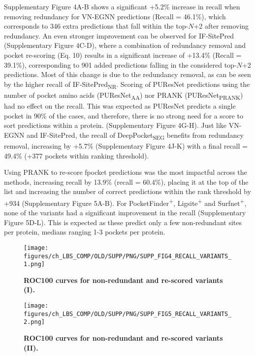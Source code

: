 Supplementary Figure 4A-B shows a significant +5.2\% increase in recall when removing redundancy for VN-EGNN predictions (Recall = 46.1\%), which corresponds to 346 extra predictions that fall within the top-$N$+2 after removing redundancy. An even stronger improvement can be observed for IF-SitePred (Supplementary Figure 4C-D), where a combination of redundancy removal and pocket re-scoring (Eq. 10) results in a significant increase of +13.4\% (Recall = 39.1\%), corresponding to 901 added predictions falling in the considered top-$N$+2 predictions. Most of this change is due to the redundancy removal, as can be seen by the higher recall of IF-SitePred\textsubscript{NR}. Scoring of PUResNet predictions using the number of pocket amino acids (PUResNet\textsubscript{AA}) nor PRANK (PUResNet\textsubscript{PRANK}) had no effect on the recall. This was expected as PUResNet predicts a single pocket in 90\% of the cases, and therefore, there is no strong need for a score to sort predictions within a protein. (Supplementary Figure 4G-H). Just like VN-EGNN and IF-SitePred, the recall of DeepPocket\textsubscript{SEG} benefits from redundancy removal, increasing by +5.7\% (Supplementary Figure 4J-K) with a final recall = 49.4\% (+377 pockets within ranking threshold).

Using PRANK to re-score fpocket predictions was the most impactful across the methods, increasing recall by 13.9\% (recall = 60.4\%), placing it at the top of the list and increasing the number of correct predictions within the rank threshold by +934 (Supplementary Figure 5A-B). For PocketFinder\textsuperscript{+}, Ligsite\textsuperscript{+} and Surfnet\textsuperscript{+}, none of the variants had a significant improvement in the recall (Supplementary Figure 5D-L). This is expected as these predict only a few non-redundant sites per protein, medians ranging 1-3 pockets per protein.

\begin{figure}[ht!]
    \centering
    \texttt{[image: figures/ch\_LBS\_COMP/OLD/SUPP/PNG/SUPP\_FIG4\_RECALL\_VARIANTS\_1.png]}
    \caption[ROC100 curves for non-redundant and re-scored variants (I)]{\textbf{ROC100 curves for non-redundant and re-scored variants (I).}}
    \label{fig:pocker_recall_variants1}
\end{figure}

\begin{figure}[ht!]
    \centering
    \texttt{[image: figures/ch\_LBS\_COMP/OLD/SUPP/PNG/SUPP\_FIG5\_RECALL\_VARIANTS\_2.png]}
    \caption[ROC100 curves for non-redundant and re-scored variants (II)]{\textbf{ROC100 curves for non-redundant and re-scored variants (II).}}
    \label{fig:pocker_recall_variants2}
\end{figure}


